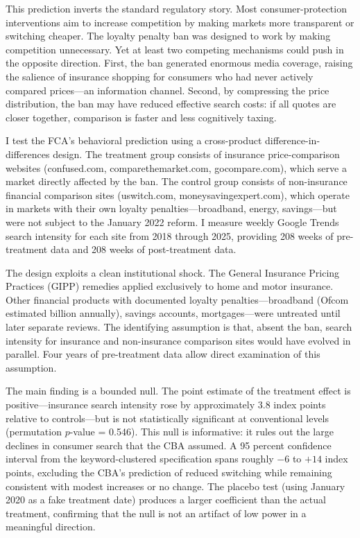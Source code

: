 \documentclass[12pt]{article}
\begin{document}
This prediction inverts the standard regulatory story. Most consumer-protection interventions aim to increase competition by making markets more transparent or switching cheaper. The loyalty penalty ban was designed to work by making competition unnecessary. Yet at least two competing mechanisms could push in the opposite direction. First, the ban generated enormous media coverage, raising the salience of insurance shopping for consumers who had never actively compared prices---an information channel. Second, by compressing the price distribution, the ban may have reduced effective search costs: if all quotes are closer together, comparison is faster and less cognitively taxing.

I test the FCA's behavioral prediction using a cross-product difference-in-differences design. The treatment group consists of insurance price-comparison websites (confused.com, comparethemarket.com, gocompare.com), which serve a market directly affected by the ban. The control group consists of non-insurance financial comparison sites (uswitch.com, moneysavingexpert.com), which operate in markets with their own loyalty penalties---broadband, energy, savings---but were not subject to the January 2022 reform. I measure weekly Google Trends search intensity for each site from 2018 through 2025, providing 208 weeks of pre-treatment data and 208 weeks of post-treatment data.

The design exploits a clean institutional shock. The General Insurance Pricing Practices (GIPP) remedies applied exclusively to home and motor insurance. Other financial products with documented loyalty penalties---broadband (Ofcom estimated  billion annually), savings accounts, mortgages---were untreated until later separate reviews. The identifying assumption is that, absent the ban, search intensity for insurance and non-insurance comparison sites would have evolved in parallel. Four years of pre-treatment data allow direct examination of this assumption.

The main finding is a bounded null. The point estimate of the treatment effect is positive---insurance search intensity rose by approximately 3.8 index points relative to controls---but is not statistically significant at conventional levels (permutation $p$-value = 0.546). This null is informative: it rules out the large declines in consumer search that the CBA assumed. A 95 percent confidence interval from the keyword-clustered specification spans roughly $-6$ to $+14$ index points, excluding the CBA's prediction of reduced switching while remaining consistent with modest increases or no change. The placebo test (using January 2020 as a fake treatment date) produces a larger coefficient than the actual treatment, confirming that the null is not an artifact of low power in a meaningful direction.
\end{document}
